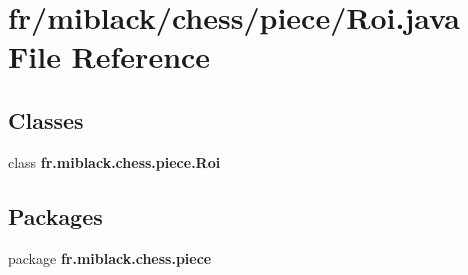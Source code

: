 \section{fr/miblack/chess/piece/\-Roi.java File Reference}
\label{Roi_8java}
\subsection*{Classes}
\begin{DoxyCompactItemize}
\item 
class {\bf fr.\-miblack.\-chess.\-piece.\-Roi}
\end{DoxyCompactItemize}
\subsection*{Packages}
\begin{DoxyCompactItemize}
\item 
package {\bf fr.\-miblack.\-chess.\-piece}
\end{DoxyCompactItemize}
